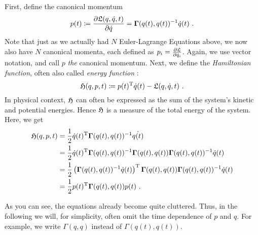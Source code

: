 First, define the canonical momentum
\begin{equation}
\label{eq:canonical-momentum}
	p(t) \coloneqq \frac{\partial \mathfrak{L}(q, \dot{q}, t)}{\partial \dot{q}} = \mathbf{\Gamma}(q(t), q(t))^{-1} \dot{q}(t) \ .
\end{equation}
Note that just as we actually had $N$ Euler-Lagrange Equations above, we now also have $N$ canonical momenta, each defined as $p_i = \frac{\partial \mathfrak{L}}{\partial \dot{q}_i}$.
Again, we use vector notation, and call $p$ \emph{the} canonical momentum.
Next, we define the \emph{Hamiltonian function}, often also called \emph{energy function} \cite{marsden10}:
\begin{equation}
	\mathfrak{H}(q, p, t) \coloneqq p(t)^\mathrm{T}\dot{q}(t) - \mathfrak{L}(q, \dot{q}, t) \ .
\end{equation}
In physical context, $\mathfrak{H}$ can often be expressed as the sum of the system's kinetic and potential energies.
Hence $\mathfrak{H}$ is a measure of the total energy of the system.
Here, we get
\begin{align}
	\mathfrak{H}(q, p, t) &= \frac{1}{2} \dot{q}(t)^{\mathrm{T}} \mathbf{\Gamma}(q(t), q(t))^{-1} \dot{q(t)} \\
	&= \frac{1}{2} \dot{q}(t)^{\mathrm{T}} \mathbf{\Gamma}(q(t), q(t))^{-1} \mathbf{\Gamma}(q(t), q(t)) \mathbf{\Gamma}(q(t), q(t))^{-1} \dot{q}(t)\\
	&= \frac{1}{2}  \left(\mathbf{\Gamma}(q(t), q(t))^{-1} \dot{q}(t)\right)^{\mathrm{T}} \mathbf{\Gamma}(q(t), q(t)) \mathbf{\Gamma}(q(t), q(t))^{-1} \dot{q}(t)\\
	&= \frac{1}{2} p(t)^{\mathrm{T}} \mathbf{\Gamma}(q(t), q(t)) p(t) \ .
\end{align}

As you can see, the equations already become quite cluttered.
Thus, in the following we will, for simplicity, often omit the time dependence of $p$ and $q$.
For example, we write $\Gamma(q, q)$ instead of $\Gamma(q(t), q(t))$.

